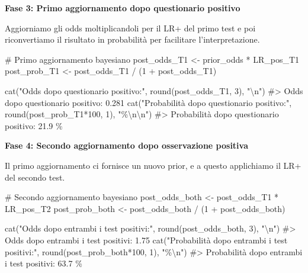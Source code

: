 \documentclass[
  letterpaper,
  DIV=11,
  numbers=noendperiod,
  oneside]{scrreprt}
\newenvironment{Shaded}{\begin{snugshade}}{\end{snugshade}}
\newcommand{\CommentTok}[1]{\textcolor[rgb]{0.37,0.37,0.37}{#1}}
\newcommand{\DecValTok}[1]{\textcolor[rgb]{0.68,0.00,0.00}{#1}}
\newcommand{\FunctionTok}[1]{\textcolor[rgb]{0.28,0.35,0.67}{#1}}
\newcommand{\NormalTok}[1]{\textcolor[rgb]{0.00,0.23,0.31}{#1}}
\newcommand{\OtherTok}[1]{\textcolor[rgb]{0.00,0.23,0.31}{#1}}
\newcommand{\SpecialCharTok}[1]{\textcolor[rgb]{0.37,0.37,0.37}{#1}}
\newcommand{\StringTok}[1]{\textcolor[rgb]{0.13,0.47,0.30}{#1}}
\theoremstyle{definition}
\theoremstyle{plain}
\theoremstyle{definition}
\theoremstyle{remark}
\begin{document}
\begin{tcolorbox}
\textbf{Fase 3: Primo aggiornamento dopo questionario positivo}

Aggiorniamo gli odds moltiplicandoli per il LR+ del primo test e poi
riconvertiamo il risultato in probabilità per facilitare
l'interpretazione.

\begin{Shaded}
\begin{Highlighting}[]
\CommentTok{\# Primo aggiornamento bayesiano}
\NormalTok{post\_odds\_T1 }\OtherTok{\textless{}{-}}\NormalTok{ prior\_odds }\SpecialCharTok{*}\NormalTok{ LR\_pos\_T1}
\NormalTok{post\_prob\_T1 }\OtherTok{\textless{}{-}}\NormalTok{ post\_odds\_T1 }\SpecialCharTok{/}\NormalTok{ (}\DecValTok{1} \SpecialCharTok{+}\NormalTok{ post\_odds\_T1)}

\FunctionTok{cat}\NormalTok{(}\StringTok{"Odds dopo questionario positivo:"}\NormalTok{, }\FunctionTok{round}\NormalTok{(post\_odds\_T1, }\DecValTok{3}\NormalTok{), }\StringTok{"}\SpecialCharTok{\textbackslash{}n}\StringTok{"}\NormalTok{)}
\CommentTok{\#\textgreater{} Odds dopo questionario positivo: 0.281}
\FunctionTok{cat}\NormalTok{(}\StringTok{"Probabilità dopo questionario positivo:"}\NormalTok{, }\FunctionTok{round}\NormalTok{(post\_prob\_T1}\SpecialCharTok{*}\DecValTok{100}\NormalTok{, }\DecValTok{1}\NormalTok{), }\StringTok{"\%}\SpecialCharTok{\textbackslash{}n\textbackslash{}n}\StringTok{"}\NormalTok{)}
\CommentTok{\#\textgreater{} Probabilità dopo questionario positivo: 21.9 \%}
\end{Highlighting}
\end{Shaded}

\textbf{Fase 4: Secondo aggiornamento dopo osservazione positiva}

Il primo aggiornamento ci fornisce un nuovo prior, e a questo
applichiamo il LR+ del secondo test.

\begin{Shaded}
\begin{Highlighting}[]
\CommentTok{\# Secondo aggiornamento bayesiano}
\NormalTok{post\_odds\_both }\OtherTok{\textless{}{-}}\NormalTok{ post\_odds\_T1 }\SpecialCharTok{*}\NormalTok{ LR\_pos\_T2}
\NormalTok{post\_prob\_both }\OtherTok{\textless{}{-}}\NormalTok{ post\_odds\_both }\SpecialCharTok{/}\NormalTok{ (}\DecValTok{1} \SpecialCharTok{+}\NormalTok{ post\_odds\_both)}

\FunctionTok{cat}\NormalTok{(}\StringTok{"Odds dopo entrambi i test positivi:"}\NormalTok{, }\FunctionTok{round}\NormalTok{(post\_odds\_both, }\DecValTok{3}\NormalTok{), }\StringTok{"}\SpecialCharTok{\textbackslash{}n}\StringTok{"}\NormalTok{)}
\CommentTok{\#\textgreater{} Odds dopo entrambi i test positivi: 1.75}
\FunctionTok{cat}\NormalTok{(}\StringTok{"Probabilità dopo entrambi i test positivi:"}\NormalTok{, }\FunctionTok{round}\NormalTok{(post\_prob\_both}\SpecialCharTok{*}\DecValTok{100}\NormalTok{, }\DecValTok{1}\NormalTok{), }\StringTok{"\%}\SpecialCharTok{\textbackslash{}n}\StringTok{"}\NormalTok{)}
\CommentTok{\#\textgreater{} Probabilità dopo entrambi i test positivi: 63.7 \%}
\end{Highlighting}
\end{Shaded}


\end{tcolorbox}
\end{document}
